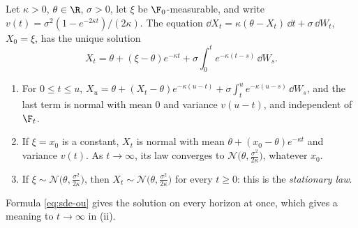 \begin{proposition}\label{prop:sde-ou}
Let $\kappa>0$, $\theta\in\R$, $\sigma>0$, let $\xi$ be $\F_0$-measurable, and write
$v(t)=\sigma^2(1-e^{-2\kappa t})/(2\kappa)$. The equation
$\dd X_t=\kappa(\theta-X_t)\,\dd t+\sigma\,\dd W_t$, $X_0=\xi$, has the unique solution
\begin{equation}\label{eq:sde-ou}
  X_t=\theta+(\xi-\theta)e^{-\kappa t}+\sigma\int_0^te^{-\kappa(t-s)}\,\dd W_s .
\end{equation}
\begin{enumerate}[label=(\roman*)]
  \item For $0\le t\le u$,
    $X_u=\theta+(X_t-\theta)e^{-\kappa(u-t)}+\sigma\int_t^ue^{-\kappa(u-s)}\,\dd W_s$, and
    the last term is normal with mean $0$ and variance $v(u-t)$, and independent of $\F_t$.
  \item If $\xi=x_0$ is a constant, $X_t$ is normal with mean $\theta+(x_0-\theta)e^{-\kappa t}$
    and variance $v(t)$. As $t\to\infty$, its law converges to
    $\mathcal N\big(\theta,\frac{\sigma^2}{2\kappa}\big)$, whatever $x_0$.
  \item If $\xi\sim\mathcal N\big(\theta,\frac{\sigma^2}{2\kappa}\big)$, then
    $X_t\sim\mathcal N\big(\theta,\frac{\sigma^2}{2\kappa}\big)$ for every $t\ge0$: this is the
    \emph{stationary law}.
\end{enumerate}
\end{proposition}

Formula \eqref{eq:sde-ou} gives the solution on every horizon at once, which gives a meaning
to $t\to\infty$ in (ii).

